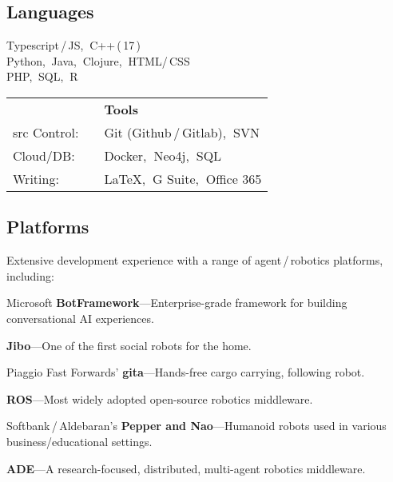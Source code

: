 \documentclass[10pt, letter]{article}
\newcommand{\years}[1]{\marginnote{\footnotesize #1}}
\newcommand{\skill}[1]{\footnotesize #1}
\begin{document}
\subsection*{Languages}
\years{Core:}   
Typescript\,/\,JS,$\:$ C++\,(\,17\,)\\
\years{Rusty:}
Python,$\:$ Java,$\:$ Clojure,$\:$ HTML/\,CSS\\
\years{Familiar:}  
PHP,$\:$ SQL,$\:$ R\\

\vspace{-2.3125cm}
\begin{minipage}[hr]{0.825\textwidth}
  \flushright
  \begin{tabular}[h]{lll}
    \vspace{0.25cm}
    & & \textbf{Tools}\\
    \skill{src Control:} & & Git (Github\,/\,Gitlab),$\:$ SVN\\
    \skill{Cloud/DB:}    & & Docker,$\:$ Neo4j,$\:$ SQL\\
    \skill{Writing:}     & & \LaTeX,$\:$ G Suite,$\:$ Office 365\\
  \end{tabular}
\end{minipage}

\subsection*{Platforms}
Extensive development experience with a range of agent\,/\,robotics platforms, including:
\begin{itemize}[leftmargin=*, parsep=0pt]
  {\light
\item Microsoft \textbf{BotFramework}---Enterprise-grade framework for building conversational AI experiences.
\item \textbf{Jibo}---One of the first social robots for the home.
\item Piaggio Fast Forwards' \textbf{gita}---Hands-free cargo carrying, following robot.
\item \textbf{ROS}---Most widely adopted open-source robotics middleware.
\item Softbank\,/\,Aldebaran's \textbf{Pepper and Nao}---Humanoid robots used in various business/educational settings.  
\item \textbf{ADE}---A research-focused, distributed, multi-agent robotics middleware.
  }
\end{itemize}
\end{document}

